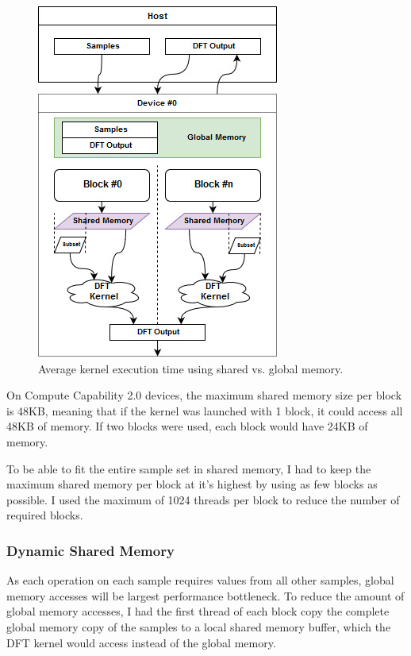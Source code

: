 \documentclass[11pt,a4paper]{article}
\begin{document}
\begin{figure}
\begin{center}
\includegraphics[scale=0.6]{cuda_impl1}
\end{center}
\caption{Average kernel execution time using shared vs. global memory.}
\label{fig:cuda_impl1}
\end{figure}

On Compute Capability 2.0 devices, the maximum shared memory size per block is 48KB, meaning that if the kernel was launched with 1 block, it could access all 48KB of memory. If two blocks were used, each block would have 24KB of memory. 

To be able to fit the entire sample set in shared memory, I had to keep the maximum shared memory per block at it's highest by using as few blocks as possible. I used the maximum of 1024 threads per block to reduce the number of required blocks. 


\subsubsection{Dynamic Shared Memory}
As each operation on each sample requires values from all other samples, global memory accesses will be largest performance bottleneck. To reduce the amount of global memory accesses, I had the first thread of each block copy the complete global memory copy of the samples to a local shared memory buffer, which the DFT kernel would access instead of the global memory. 
\end{document}
